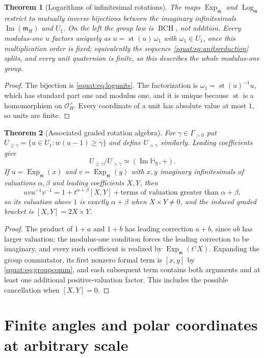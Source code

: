 \documentclass[11pt,letterpaper]{article}
\numberwithin{equation}{section}
\newtheorem{theorem}{Theorem}[section]
\theoremstyle{definition}
\theoremstyle{remark}
\newcommand{\HR}{\mathbb H_{\mathbb R}}
\newcommand{\OO}{\mathcal O}
\newcommand{\mm}{\mathfrak m}
\newcommand{\Ima}{\operatorname{Im}}
\newcommand{\st}{\operatorname{st}}
\newcommand{\Exp}{\operatorname{Exp}}
\newcommand{\Log}{\operatorname{Log}}
\newcommand{\Expm}{\Exp_{\mm}}
\newcommand{\Logm}{\Log_{\mm}}
\newcommand{\BCH}{\operatorname{BCH}}
\begin{document}
\begin{theorem}[Logarithms of infinitesimal rotations]\label{squat:thm:rotation-log}
The maps $\Expm$ and $\Logm$ restrict to mutually inverse bijections between the
imaginary infinitesimals $\Ima(\mm_H)$ and $U_1$. On the left the group law is $\BCH$, not
addition. Every modulus-one $u$ factors uniquely as $u=\st(u)\,\omega_1$ with
$\omega_1\in U_1$, once this multiplication order is fixed; equivalently the sequence
\cref{squat:eq:unitsreduction} splits, and every unit quaternion is finite, so this
describes the whole modulus-one group.
\end{theorem}
\begin{proof}
The bijection is \cref{squat:eq:logunits}. The factorization is $\omega_1=\st(u)^{-1}u$,
which has standard part one and modulus one, and it is unique because $\st$ is a
homomorphism on $\OO_H^\times$. Every coordinate of a unit has absolute value at most
$1$, so units are finite.
\end{proof}

\begin{theorem}[Associated graded rotation algebra]\label{squat:thm:graded}
For $\gamma\in\Gamma_{>0}$ put $U_{\ge\gamma}=\{u\in U_1:w(u-1)\ge\gamma\}$ and define
$U_{>\gamma}$ similarly. Leading coefficients give
\[
 U_{\ge\gamma}/U_{>\gamma}\simeq(\Ima\HR,+).
\]
If $u=\Expm(x)$ and $v=\Expm(y)$ with $x,y$ imaginary infinitesimals of valuations
$\alpha,\beta$ and leading coefficients $X,Y$, then
\[
 uvu^{-1}v^{-1}=1+t^{\alpha+\beta}[X,Y]+\text{terms of valuation greater than }
 \alpha+\beta ,
\]
so its valuation above $1$ is exactly $\alpha+\beta$ when $X\times Y\ne0$, and the induced
graded bracket is $[X,Y]=2X\times Y$.
\end{theorem}
\begin{proof}
The product of $1+a$ and $1+b$ has leading correction $a+b$, since $ab$ has larger
valuation; the modulus-one condition forces the leading correction to be imaginary, and
every such coefficient is realized by $\Expm(t^\gamma X)$. Expanding the group commutator,
its first nonzero formal term is $[x,y]$ by \cref{squat:eq:groupcomm}, and each subsequent
term contains both arguments and at least one additional positive-valuation factor. This
includes the possible cancellation when $[X,Y]=0$.
\end{proof}

\section{Finite angles and polar coordinates at arbitrary scale}\label{squat:sec:angles}
\end{document}
